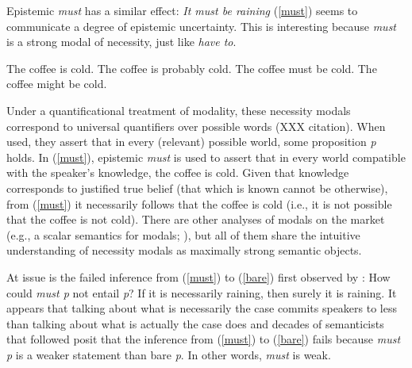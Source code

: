 \documentclass[11pt]{article}
\begin{document}
Epistemic \emph{must} has a similar effect: \emph{It must be raining} (\ref{must}) seems to communicate a degree of epistemic uncertainty. This is interesting because \emph{must} is a strong modal of necessity, just like \emph{have to}. 

\begin{exe}
	\ex\label{english} \begin{xlist}
		\ex\label{bare} The coffee is cold.
		\ex\label{prob} The coffee is probably cold.
		\ex\label{must} The coffee must be cold.
		\ex\label{might} The coffee might be cold.
	\end{xlist}
\end{exe}


Under a quantificational treatment of modality, these necessity modals correspond to universal quantifiers over possible words (XXX citation). When used, they assert that in every (relevant) possible world, some proposition \emph{p} holds. In (\ref{must}), epistemic \emph{must} is used to assert that in every world compatible with the speaker's knowledge, the coffee is cold. Given that knowledge corresponds to justified true belief (that which is known cannot be otherwise), from (\ref{must}) it necessarily follows that the coffee is cold (i.e., it is not possible that the coffee is not cold). There are other analyses of modals on the market (e.g., a scalar semantics for modals; \cite{lassiter2011}), but all of them share the intuitive understanding of necessity modals as maximally strong semantic objects.

At issue is the failed inference from (\ref{must}) to (\ref{bare}) first observed by \cite{karttunen1972}: How could \emph{must p} not entail \emph{p}? If it is necessarily raining, then surely it is raining. It appears that talking about what is necessarily the case commits speakers to less than talking about what is actually the case does \cite{karttunen1972} and decades of semanticists that followed posit that the inference from (\ref{must}) to (\ref{bare}) fails because \emph{must p} is a weaker statement than bare \emph{p}. In other words, \emph{must} is weak. 
\end{document}
